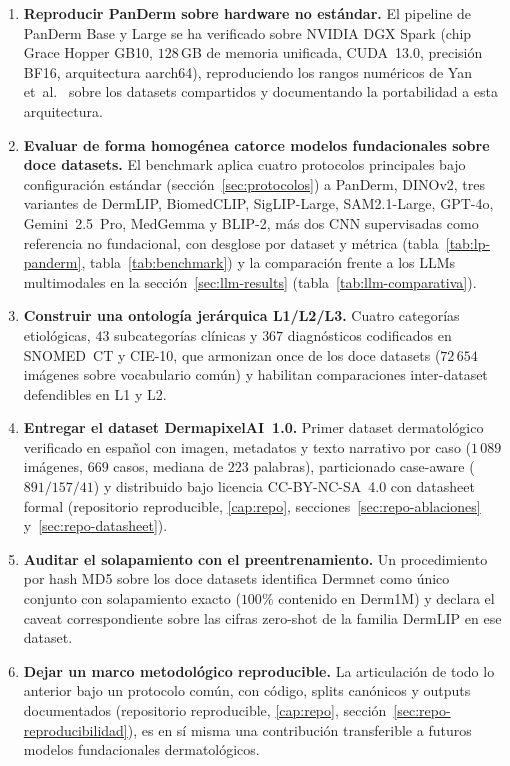 \begin{enumerate}
\item \textbf{Reproducir PanDerm sobre hardware no estándar.} El
pipeline de PanDerm Base y Large se ha verificado sobre NVIDIA DGX Spark
(chip Grace Hopper GB10, $128$\,GB de memoria unificada, CUDA~13.0,
precisión BF16, arquitectura aarch64), reproduciendo los rangos
numéricos de Yan et~al.~\cite{panderm2025} sobre los datasets
compartidos y documentando la portabilidad a esta arquitectura.

\item \textbf{Evaluar de forma homogénea catorce modelos fundacionales
sobre doce datasets.} El benchmark aplica cuatro protocolos principales
bajo configuración estándar (sección~\ref{sec:protocolos}) a PanDerm,
DINOv2, tres variantes de DermLIP, BiomedCLIP, SigLIP-Large,
SAM2.1-Large, GPT-4o, Gemini~2.5~Pro, MedGemma y BLIP-2, más dos CNN
supervisadas como referencia no fundacional, con desglose por dataset y
métrica (tabla~\ref{tab:lp-panderm}, tabla~\ref{tab:benchmark}) y la
comparación frente a los LLMs multimodales en la
sección~\ref{sec:llm-results} (tabla~\ref{tab:llm-comparativa}).

\item \textbf{Construir una ontología jerárquica L1/L2/L3.} Cuatro
categorías etiológicas, $43$ subcategorías clínicas y $367$ diagnósticos
codificados en SNOMED~CT y CIE-10, que armonizan once de los doce
datasets ($72\,654$ imágenes sobre vocabulario común) y habilitan
comparaciones inter-dataset defendibles en L1 y L2.

\item \textbf{Entregar el dataset DermapixelAI~1.0.} Primer dataset
dermatológico verificado en español con imagen, metadatos y texto
narrativo por caso ($1\,089$ imágenes, $669$ casos, mediana de $223$
palabras), particionado case-aware ($891 / 157 / 41$) y distribuido bajo
licencia CC-BY-NC-SA~4.0 con datasheet formal (repositorio reproducible,
\ref{cap:repo}, secciones~\ref{sec:repo-ablaciones}
y~\ref{sec:repo-datasheet}).

\item \textbf{Auditar el solapamiento con el preentrenamiento.} Un
procedimiento por hash MD5 sobre los doce datasets identifica Dermnet
como único conjunto con solapamiento exacto ($100\%$ contenido en
Derm1M) y declara el caveat correspondiente sobre las cifras zero-shot
de la familia DermLIP en ese dataset.

\item \textbf{Dejar un marco metodológico reproducible.} La articulación
de todo lo anterior bajo un protocolo común, con código, splits
canónicos y outputs documentados (repositorio reproducible,
\ref{cap:repo}, sección~\ref{sec:repo-reproducibilidad}), es en sí misma
una contribución transferible a futuros modelos fundacionales
dermatológicos.
\end{enumerate}

